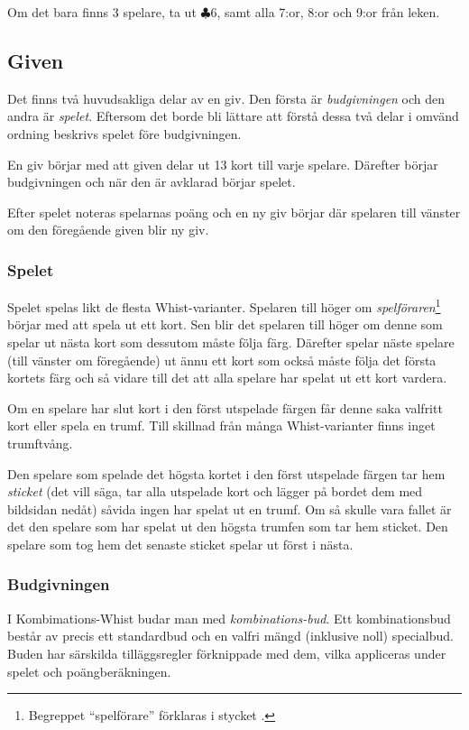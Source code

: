 \documentclass[a4paper]{article}
\begin{document}
			Om det bara finns 3 spelare, ta ut $\clubsuit 6$, samt alla 7:or, 8:or och 9:or från leken.

		\subsection{Given}
			Det finns två huvudsakliga delar av en giv. Den första är \emph{budgivningen} och den andra är \emph{spelet}. Eftersom det borde bli lättare att förstå dessa två delar i omvänd ordning beskrivs spelet före budgivningen.

			En giv börjar med att given delar ut 13 kort till varje spelare. Därefter börjar budgivningen och när den är avklarad börjar spelet.

			Efter spelet noteras spelarnas poäng och en ny giv börjar där spelaren till vänster om den föregående given blir ny giv.

			\subsubsection{Spelet}
				Spelet spelas likt de flesta Whist-varianter. Spelaren till höger om \emph{spelföraren}\footnote{Begreppet ``spelförare'' förklaras i stycket \textit{}.} börjar med att spela ut ett kort. Sen blir det spelaren till höger om denne som spelar ut nästa kort som dessutom måste följa färg. Därefter spelar näste spelare (till vänster om föregående) ut ännu ett kort som också måste följa det första kortets färg och så vidare till det att alla spelare har spelat ut ett kort vardera.

				Om en spelare har slut kort i den först utspelade färgen får denne saka valfritt kort eller spela en trumf. Till skillnad från många Whist-varianter finns inget trumftvång.

				Den spelare som spelade det högsta kortet i den först utspelade färgen tar hem \emph{sticket} (det vill säga, tar alla utspelade kort och lägger på bordet dem med bildsidan nedåt) såvida ingen har spelat ut en trumf. Om så skulle vara fallet är det den spelare som har spelat ut den högsta trumfen som tar hem sticket. Den spelare som tog hem det senaste sticket spelar ut först i nästa.

			\subsubsection{Budgivningen}
				\label{sec:bidding}
				I Kombimations-Whist budar man med \emph{kombinations-bud}. Ett kombinationsbud består av precis ett standardbud och en valfri mängd (inklusive noll) specialbud. Buden har särskilda tilläggsregler förknippade med dem, vilka appliceras under spelet och poängberäkningen.
\end{document}
